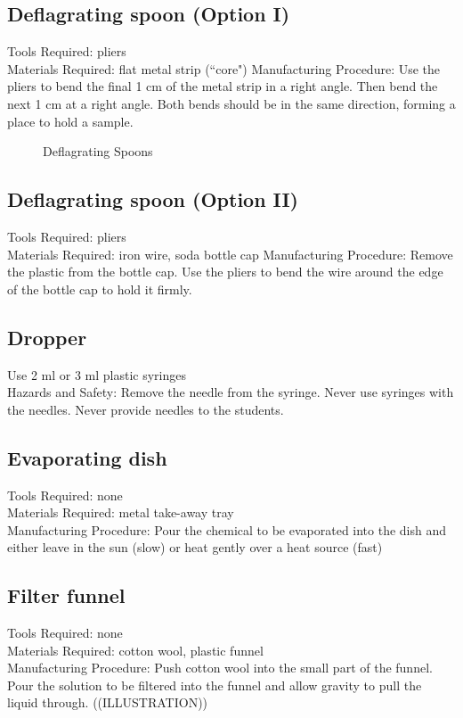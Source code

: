 \subsection*{Deflagrating spoon (Option I)}
Tools Required: pliers\\
Materials Required: flat metal strip (``core")
Manufacturing Procedure: Use the pliers to bend the final 1 cm of the metal strip in a right angle. Then bend the next 1 cm at a right angle. Both bends should be in the same direction, forming a place to hold a sample.

\begin{figure}[h]
\begin{center}
\def\svgwidth{200pt}

\caption{Deflagrating Spoons}
\end{center}
\end{figure}

\subsection*{Deflagrating spoon (Option II)}
Tools Required: pliers\\
Materials Required: iron wire, soda bottle cap
Manufacturing Procedure: Remove the plastic from the bottle cap. Use the pliers to bend the wire around the edge of the bottle cap to hold it firmly.

\subsection*{Dropper}
Use 2 ml or 3 ml plastic syringes
\\Hazards and Safety: Remove the needle from the syringe. Never use syringes with the needles. Never provide needles to the students.

\subsection*{Evaporating dish}
Tools Required: none\\
Materials Required: metal take-away tray\\
Manufacturing Procedure: Pour the chemical to be evaporated into the dish and either leave in the sun (slow) or heat gently over a heat source (fast)

\subsection*{Filter funnel}
Tools Required: none\\
Materials Required: cotton wool, plastic funnel\\
Manufacturing Procedure: Push cotton wool into the small part of the funnel. Pour the solution to be filtered into the funnel and allow gravity to pull the liquid through. ((ILLUSTRATION))

